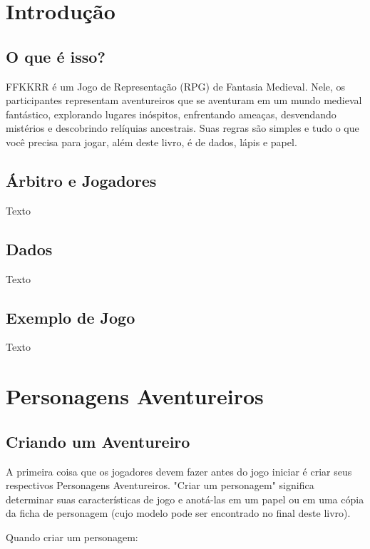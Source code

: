 \documentclass[a5paper, 10pt]{book}
\begin{document}
\tableofcontents

\chapter{Introdução}

\section{O que é isso?}

FFKKRR é um Jogo de Representação (RPG) de Fantasia Medieval. Nele, os participantes representam aventureiros que se aventuram em um mundo medieval fantástico, explorando lugares inóspitos, enfrentando ameaças, desvendando mistérios e descobrindo relíquias ancestrais. Suas regras são simples e tudo o que você precisa para jogar, além deste livro, é de dados, lápis e papel.

\section{Árbitro e Jogadores}

Texto

\section{Dados}

Texto

\section{Exemplo de Jogo}

Texto

\chapter{Personagens Aventureiros}

\section{Criando um Aventureiro}

A primeira coisa que os jogadores devem fazer antes do jogo iniciar é criar seus respectivos Personagens Aventureiros. "Criar um personagem" significa determinar suas características de jogo e anotá-las em um papel ou em uma cópia da ficha de personagem (cujo modelo pode ser encontrado no final deste livro).

Quando criar um personagem:
\end{document}
